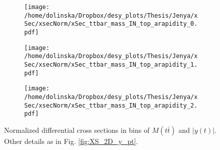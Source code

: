 \begin{figure}[H]
\centering
\begin{subfigure}
  \centering
  \texttt{[image: /home/dolinska/Dropbox/desy\_plots/Thesis/Jenya/xSec/xsecNorm/xSec\_ttbar\_mass\_IN\_top\_arapidity\_0.pdf]}
\end{subfigure}
\begin{subfigure}
  \centering
  \texttt{[image: /home/dolinska/Dropbox/desy\_plots/Thesis/Jenya/xSec/xsecNorm/xSec\_ttbar\_mass\_IN\_top\_arapidity\_1.pdf]}
\end{subfigure}
\begin{subfigure}
  \centering
  \texttt{[image: /home/dolinska/Dropbox/desy\_plots/Thesis/Jenya/xSec/xsecNorm/xSec\_ttbar\_mass\_IN\_top\_arapidity\_2.pdf]}
\end{subfigure}
\caption{Normalized differential cross sections in bins of $M(t\bar{t})$ and $|y(t)|$. Other details as in Fig. \ref{fig:XS_2D_y_pt}.}
\label{fig:XS_2D_Mtt_yt}
\end{figure}

